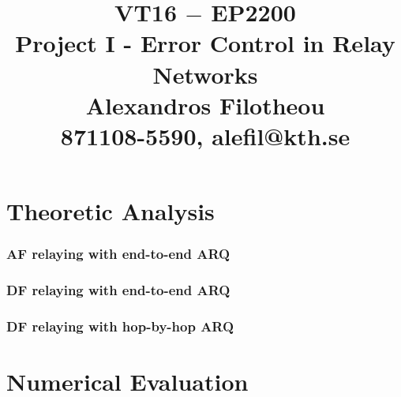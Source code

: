 \documentclass[a4paper,12pt,oneside,onecolumn]{article} %
\title{VT16 $-$ EP2200 \\
  Project I - Error Control in Relay Networks \\
  Alexandros Filotheou \\
  871108-5590, alefil@kth.se }
\date{}
\begin{document}
	\maketitle

  \part*{Theoretic Analysis}

    \section{AF relaying with end-to-end ARQ}
    

    \section{DF relaying with end-to-end ARQ}
    

    \section{DF relaying with hop-by-hop ARQ}
    


  \part*{Numerical Evaluation}
\end{document}
